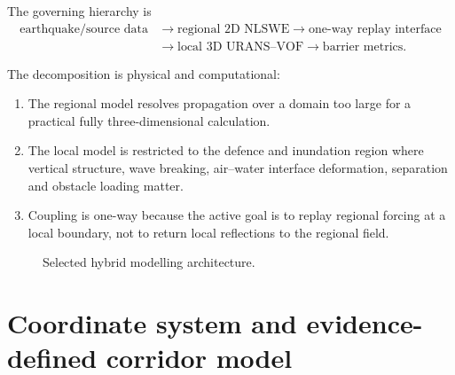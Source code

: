 \documentclass[11pt,a4paper]{article}
\begin{document}
The governing hierarchy is
\begin{equation}
  \begin{aligned}
  \text{earthquake/source data}
  &\longrightarrow \text{regional 2D NLSWE}
  \longrightarrow \text{one-way replay interface}\\
  &\longrightarrow \text{local 3D URANS--VOF}
  \longrightarrow \text{barrier metrics}.
  \end{aligned}
\end{equation}

The decomposition is physical and computational:

\begin{enumerate}
  \item The regional model resolves propagation over a domain too large for a practical fully three-dimensional calculation.
  \item The local model is restricted to the defence and inundation region where vertical structure, wave breaking, air--water interface deformation, separation and obstacle loading matter.
  \item Coupling is one-way because the active goal is to replay regional forcing at a local boundary, not to return local reflections to the regional field.
\end{enumerate}

\begin{figure}[H]
\centering
{}
\caption{Selected hybrid modelling architecture.}
\end{figure}

\section{Coordinate system and evidence-defined corridor model}
\end{document}
